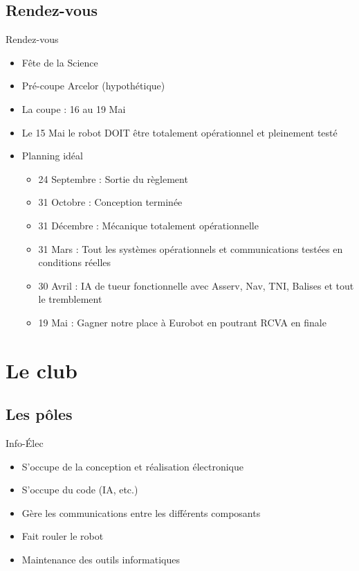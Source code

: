 \documentclass{beamer}
\begin{document}
\subsection{Rendez-vous}
\begin{frame}{Rendez-vous}
	\begin{itemize}
		\item Fête de la Science
		\item Pré-coupe Arcelor (hypothétique)
		\item La coupe : 16 au 19 Mai
		\item Le 15 Mai le robot DOIT être totalement opérationnel et pleinement testé
		\item Planning idéal
			\begin{itemize}
				\item 24 Septembre : Sortie du règlement
				\item 31 Octobre : Conception terminée
				\item 31 Décembre : Mécanique totalement opérationnelle
				\item 31 Mars : Tout les systèmes opérationnels et communications testées en conditions réelles
				\item 30 Avril : IA de tueur fonctionnelle avec Asserv, Nav, TNI, Balises et tout le tremblement
				\item 19 Mai : Gagner notre place à Eurobot en poutrant RCVA en finale
			\end{itemize}
	\end{itemize}
\end{frame}


\section{Le club}
\subsection{Les pôles}
\begin{frame}{Info-\'Elec}
	\begin{itemize}
		\item S'occupe de la conception et réalisation électronique
		\item S'occupe du code (IA, etc.)
		\item Gère les communications entre les différents composants
		\item Fait rouler le robot
		\item Maintenance des outils informatiques
	\end{itemize}
\end{frame}
\end{document}
